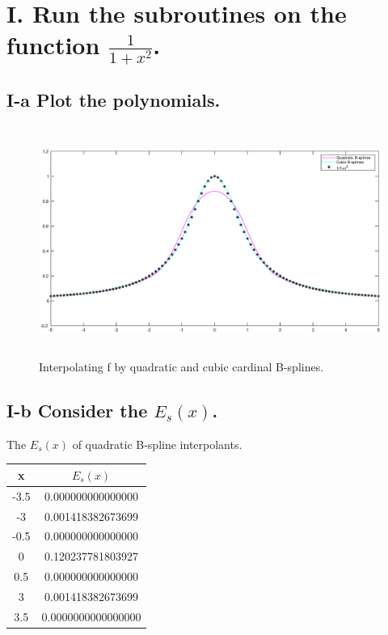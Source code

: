 \documentclass[twoside,a4paper]{article}
\begin{document}
\pagestyle{fancy}
\fancyhead{}


\section*{I. \small{Run the subroutines on the function $\frac{1}{1+x^2}$.}}

\subsection*{I-a \small{Plot the polynomials.}}

\begin{figure}[h]
	\centering
	\includegraphics[width=15cm, height=7.5cm]{Bsplines.eps}
	\caption{Interpolating f by quadratic and cubic cardinal B-splines.}
\end{figure}

\subsection*{I-b \small{Consider the $E_{s}(x)$.}}

The $E_s(x)$ of quadratic B-spline interpolants.

\begin{tabular}{|c|c|}
\hline
x&$E_s(x)$\\
\hline
-3.5& 0.000000000000000\\
\hline
-3& 0.001418382673699\\
\hline
-0.5& 0.000000000000000\\
\hline
0& 0.120237781803927\\
\hline
0.5& 0.000000000000000\\
\hline
3& 0.001418382673699\\
\hline
3.5& 0.0000000000000000\\
\hline
\end{tabular}
\end{document}
